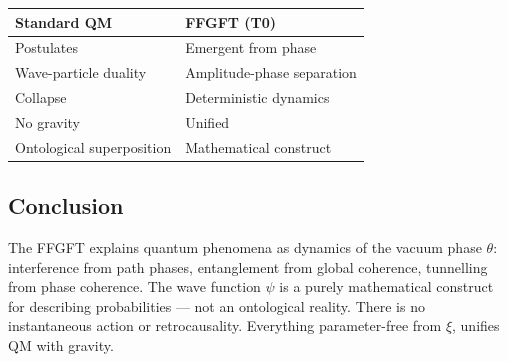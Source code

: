 	\begin{center}
		\begin{tabular}{p{}p{}}
			\textbf{Standard QM} & \textbf{FFGFT (T0)} \\
			\hline
			Postulates & Emergent from phase \\
			Wave-particle duality & Amplitude-phase separation \\
			Collapse & Deterministic dynamics \\
			No gravity & Unified \\
			Ontological superposition & Mathematical construct \\
		\end{tabular}
	\end{center}
	
	\subsection*{Conclusion}
	
	The FFGFT explains quantum phenomena as dynamics of the vacuum phase \(\theta\): interference from path phases, entanglement from global coherence, tunnelling from phase coherence. The wave function \(\psi\) is a purely mathematical construct for describing probabilities — not an ontological reality. There is no instantaneous action or retrocausality. Everything parameter-free from \(\xi\), unifies QM with gravity.



